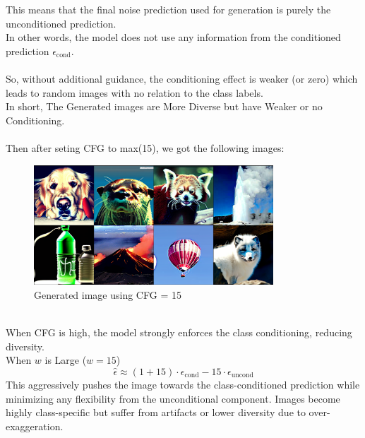 \documentclass{article}
\begin{document}
This means that the final noise prediction used for generation is purely the unconditioned prediction. \\
In other words, the model does not use any information from the conditioned prediction \( \epsilon_{\text{cond}} \).
\\ \\
So, without additional guidance, the conditioning effect is weaker (or zero) which leads to random images with no relation to the class labels. 
\\
In short, The Generated images are More Diverse but have Weaker or no Conditioning.
\\ \\
Then after seting CFG to max(15), we got the following images:
\\
\begin{figure}[h] %
    \centering
    \includegraphics[width=0.8\textwidth]{images/image1.png} %
    \caption{Generated image using CFG = 15}
    \label{fig:cfg5} %
\end{figure}
\\
When CFG is high, the model strongly enforces the class conditioning, reducing diversity. \\
When \( w \) is Large (\( w = 15 \))
\[
\hat{\epsilon} \approx (1 + 15) \cdot \epsilon_{\text{cond}} - 15 \cdot \epsilon_{\text{uncond}}
\]
This aggressively pushes the image towards the class-conditioned prediction while minimizing any flexibility from the unconditional component.
Images become highly class-specific but suffer from artifacts or lower diversity due to over-exaggeration.
\end{document}
